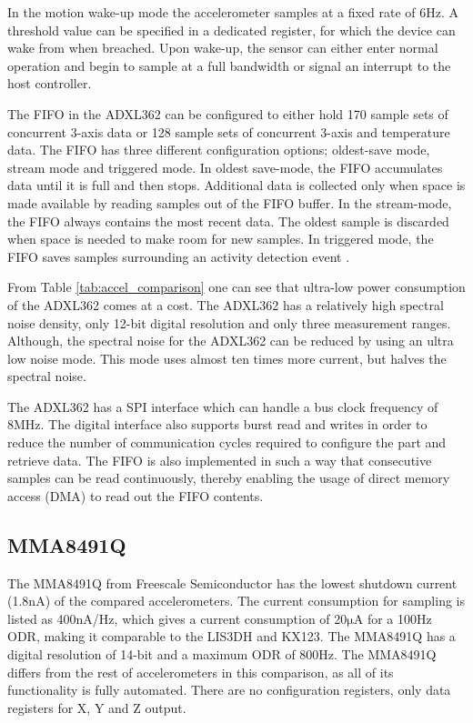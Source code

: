 In the motion wake-up mode the accelerometer samples at a fixed rate of 6Hz. A threshold value can be specified in a dedicated register, for which the device can wake from when breached. Upon wake-up, the sensor can either enter normal operation and begin to sample at a full bandwidth or signal an interrupt to the host controller.

The FIFO in the ADXL362 can be configured to either hold 170 sample sets of concurrent 3-axis data or 128 sample sets of concurrent 3-axis and temperature data. The FIFO has three different configuration options; oldest-save mode, stream mode and triggered mode. In oldest save-mode, the  FIFO accumulates data until it is full and then stops. Additional data is collected only when space is made available by reading samples out of the FIFO buffer. In the stream-mode, the FIFO always contains the most recent data. The oldest sample is discarded when space is needed to make room for new samples. In triggered mode, the FIFO saves samples surrounding an activity detection event \cite[p~38]{ADXL362}.

From Table \ref{tab:accel_comparison} one can see that ultra-low power consumption of the ADXL362 comes at a cost. The ADXL362 has a relatively high spectral noise density, only 12-bit digital resolution and only three measurement ranges. Although, the spectral noise for the ADXL362 can be reduced by using an ultra low noise mode. This mode uses almost ten times more current, but halves the spectral noise.

The ADXL362 has a SPI interface which can handle a bus clock frequency of 8MHz. The digital interface also supports burst read and writes in order to reduce the number of communication cycles required to configure the part and retrieve data. The FIFO is also implemented in such a way that consecutive samples can be read continuously, thereby enabling the usage of direct memory access (DMA) to read out the FIFO contents.

\subsection{MMA8491Q}

The MMA8491Q from Freescale Semiconductor has the lowest shutdown current (1.8$\si{\nano\ampere}$) of the compared accelerometers. The current consumption for sampling is listed as 400nA/Hz, which gives a current consumption of 20$\si{\micro\ampere}$ for a 100Hz ODR, making it comparable to the LIS3DH and KX123. The MMA8491Q has a digital resolution of 14-bit and a maximum ODR of 800Hz. The MMA8491Q differs from the rest of accelerometers in this comparison, as all of its functionality is fully automated. There are no configuration registers, only data registers for X, Y and Z output. %


